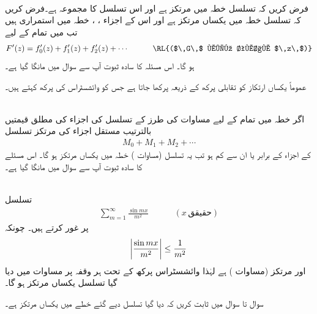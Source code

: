 \quad {}\\
فرض کریں کہ تسلسل  خطہ  میں مرتکز ہے اور اس تسلسل کا مجموعہ  ہے۔فرض کریں کہ تسلسل
  خطہ  میں یکساں مرتکز ہے اور اس کے اجزاء ، ،  خطہ  میں استمراری ہیں تب  میں تمام  کے لیے 
\begin{align*}
F'(z)=f'_0(z)+f'_1(z)+f'_2(z)+\cdots\quad \quad \quad \text{\RL{($\,G\,$ میں تمام $\,z\,$)}}
\end{align*}
ہو گا۔
اس مسئلہ کا سادہ ثبوت آپ سے سوال  میں مانگا گیا ہے۔

عموماً یکساں ارتکاز کو تقابلی پرکھ کے ذریعہ  پرکھا جاتا ہے جس کو وائشسٹراس کی پرکھ  کہتے ہیں۔

\quad {}\\
اگر خطہ  میں تمام  کے لیے مساوات  کی طرز کے تسلسل کی اجزاء کی مطلق قیمتیں بالترتیب مستقل اجزاء کی مرتکز تسلسل
\begin{align}
M_0+M_1+M_2+\cdots
\end{align} 
کے اجزاء کے برابر  یا ان سے کم ہو تب یہ تسلسل (مساوات ) خطہ میں یکساں مرتکز ہو گا۔ 
اس مسئلے کا سادہ ثبوت آپ سے سوال  میں مانگا گیا ہے۔

\quad {}\\
تسلسل
\begin{align}\label{مساوات_ٹیلر_وائشسٹراس_ایم}
\sum\limits_{m=1}^{\infty} \frac{\sin mx}{m^2}\quad \quad \quad (x\,\text{حقیقق})
\end{align}
پر غور کرتے ہیں۔ چونکہ
\begin{align*}
\abs{\frac{\sin mx}{m^2}}\le \frac{1}{m^2}
\end{align*}
 اور  مرتکز (مساوات ) ہے  لہٰذا  وائشسٹراس پرکھ  کے تحت  ہر وقفہ پر مساوات  میں دیا گیا تسلسل یکساں مرتکز  ہو گا۔

سوال  تا سوال  میں ثابت کریں کہ دیا گیا تسلسل دیے گئے خطے میں یکساں مرتکز ہے۔

